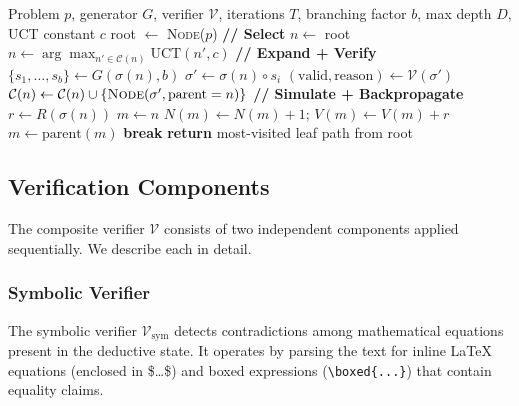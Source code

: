 \documentclass[11pt,a4paper]{article}
\begin{document}
\begin{algorithm}[t]
\caption{Deductive-State MCTS with Verification}
\label{alg:dsmcts}
\begin{algorithmic}[1]
\REQUIRE Problem $p$, generator $G$, verifier $\mathcal{V}$, iterations $T$, branching factor $b$, max depth $D$, UCT constant $c$
\STATE root $\leftarrow$ \textsc{Node}($p$)
    \STATE \textbf{// Select}
    \STATE $n \leftarrow$ root
        \STATE $n \leftarrow \arg\max_{n' \in \mathcal{C}(n)} \text{UCT}(n', c)$
    \ENDWHILE
    \STATE \textbf{// Expand + Verify}
        \STATE $\{s_1, \ldots, s_b\} \leftarrow G(\sigma(n), b)$
            \STATE $\sigma' \leftarrow \sigma(n) \circ s_i$
            \STATE $(\text{valid}, \text{reason}) \leftarrow \mathcal{V}(\sigma')$
                \STATE $\mathcal{C}(n) \leftarrow \mathcal{C}(n) \cup \{\textsc{Node}(\sigma', \text{parent}=n)\}$
            \ENDIF
        \ENDFOR
    \ENDIF
    \STATE \textbf{// Simulate + Backpropagate}
    \STATE $r \leftarrow R(\sigma(n))$
    \STATE $m \leftarrow n$
        \STATE $N(m) \leftarrow N(m) + 1$; \quad $V(m) \leftarrow V(m) + r$
        \STATE $m \leftarrow \text{parent}(m)$
    \ENDWHILE
        \STATE \textbf{break} 
    \ENDIF
\ENDFOR
\STATE \textbf{return} most-visited leaf path from root
\end{algorithmic}
\end{algorithm}

\subsection{Verification Components}
\label{sec:verifier_components}

The composite verifier $\mathcal{V}$ consists of two independent components
applied sequentially. We describe each in detail.

\subsubsection{Symbolic Verifier}

The symbolic verifier $\mathcal{V}_{\text{sym}}$ detects contradictions among
mathematical equations present in the deductive state. It operates by parsing
the text for inline LaTeX equations (enclosed in \$\ldots\$) and boxed
expressions (\verb|\boxed{...}|) that contain equality claims.
\end{document}
